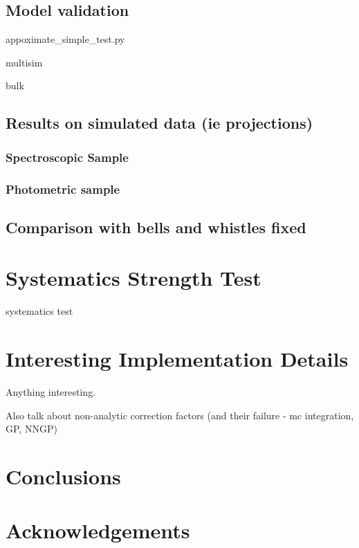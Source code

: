 \documentclass[a4paper,fleqn,usenatbib]{mnras}
\begin{document}
\subsection{Model validation}

appoximate\_simple\_test.py

multisim

bulk


\subsection{Results on simulated data (ie projections)}

\subsubsection{Spectroscopic Sample}

\subsubsection{Photometric sample}

\subsection{Comparison with bells and whistles fixed}


\section{Systematics Strength Test}
\label{sec:sys}

systematics test

\section{Interesting Implementation Details}
\label{sec:details}
Anything interesting.

Also talk about non-analytic correction factors (and their failure - mc integration, GP, NNGP)



\section{Conclusions}



\section*{Acknowledgements}
\end{document}
